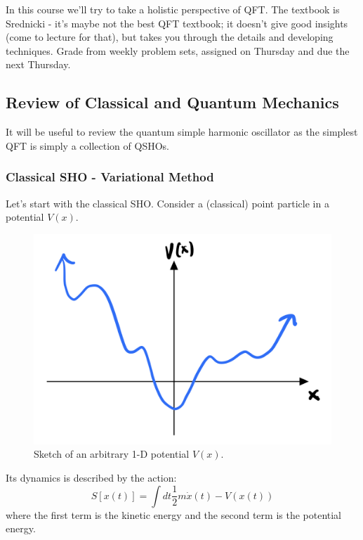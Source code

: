 In this course we'll try to take a holistic perspective of QFT. The textbook is Srednicki - it's maybe not the best QFT textbook; it doesn't give good insights (come to lecture for that), but takes you through the details and developing techniques. Grade from weekly problem sets, assigned on Thursday and due the next Thursday.

\subsection{Review of Classical and Quantum Mechanics}
It will be useful to review the quantum simple harmonic oscillator as the simplest QFT is simply a collection of QSHOs.

\subsubsection*{Classical SHO - Variational Method}
Let's start with the classical SHO. Consider a (classical) point particle in a potential $V(x)$. 
\begin{figure}[htbp]
    \centering
    \includegraphics[scale=0.4]{Lectures/Figures/arbitrary_potential.png}
    \caption{Sketch of an arbitrary 1-D potential $V(x)$.}
    \label{fig:arbitrary_potential}
\end{figure}
Its dynamics is described by the action:
\begin{equation}
    S[x(t)] = \int dt \frac{1}{2}m\dot{x}(t) - V(x(t))
\end{equation}
where the first term is the kinetic energy and the second term is the potential energy.

